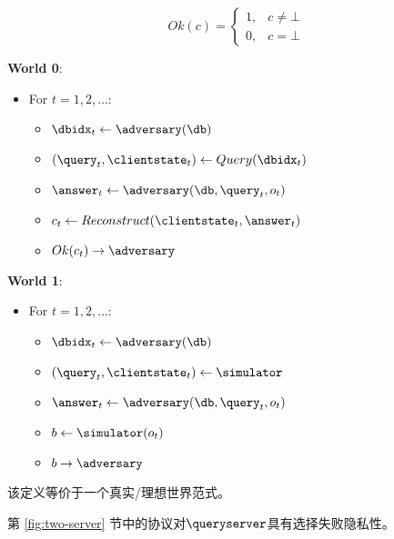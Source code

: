 $$Ok(c)=\left\{\begin{array}{ll}
        1, & c\neq \bot \\
        0, & c = \bot
    \end{array}\right.$$
\begin{mdframed}
    \begin{multicols}{2}
        \textbf{World 0}:
        \begin{itemize}
            \item For $t=1,2,\dots$:
                  \begin{itemize}
                      \item $\dbidx_t \leftarrow \adversary(\db)$
                      \item $(\query_t,\clientstate_t) \leftarrow Query(\dbidx_t)$
                      \item $\answer_t \leftarrow \adversary(\db, \query_t, o_t)$
                      \item $c_t \leftarrow Reconstruct(\clientstate_t, \answer_t)$
                      \item $Ok(c_t) \rightarrow \adversary$
                  \end{itemize}
        \end{itemize}
        \textbf{World 1}:
        \begin{itemize}
            \item For $t=1,2,\dots$:
                  \begin{itemize}
                      \item $\dbidx_t \leftarrow \adversary(\db)$
                      \item $(\query_t,\clientstate_t) \leftarrow \simulator$
                      \item $\answer_t \leftarrow \adversary(\db, \query_t, o_t)$
                      \item $b \leftarrow \simulator(o_t)$
                      \item $b \rightarrow \adversary$
                  \end{itemize}
        \end{itemize}
    \end{multicols}
\end{mdframed}

该定义等价于一个真实/理想世界范式。

\begin{theorem}
    第 \ref{fig:two-server} 节中的协议对$\queryserver$具有选择失败隐私性。
\end{theorem}
    
